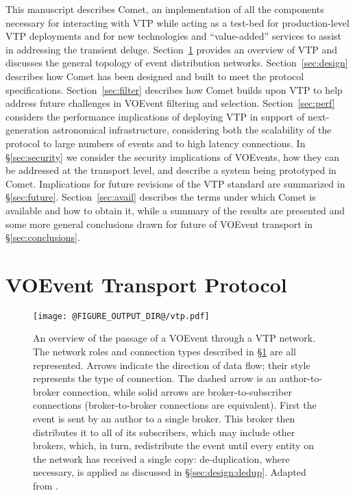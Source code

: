 \documentclass[5p,authoryear]{elsarticle}
\begin{document}
This manuscript describes Comet, an implementation of all the components
necessary for interacting with VTP while acting as a test-bed for
production-level VTP deployments and for new technologies and ``value-added''
services to assist in addressing the transient deluge. Section~\ref{sec:vtp}
provides an overview of VTP and discusses the general topology of event
distribution networks. Section~\ref{sec:design} describes how Comet has been
designed and built to meet the protocol specifications.
Section~\ref{sec:filter} describes how Comet builds upon VTP to help address
future challenges in VOEvent filtering and selection. Section~\ref{sec:perf}
considers the performance implications of deploying VTP in support of
next-generation astronomical infrastructure, considering both the scalability
of the protocol to large numbers of events and to high latency connections. In
\S\ref{sec:security} we consider the security implications of VOEvents, how
they can be addressed at the transport level, and describe a system being
prototyped in Comet.  Implications for future revisions of the VTP standard
are summarized in \S\ref{sec:future}. Section~\ref{sec:avail} describes the
terms under which Comet is available and how to obtain it, while a summary of
the results are presented and some more general conclusions drawn for future
of VOEvent transport in \S\ref{sec:conclusions}.

\section{VOEvent Transport Protocol}
\label{sec:vtp}

\begin{figure}
  \begin{center}
  \texttt{[image: @FIGURE\_OUTPUT\_DIR@/vtp.pdf]}
  \end{center}

  \caption{An overview of the passage of a VOEvent through a VTP network. The
  network roles and connection types described in \S\ref{sec:vtp} are all
  represented. Arrows indicate the direction of data flow; their style
  represents the type of connection. The dashed arrow is an author-to-broker
  connection, while solid arrows are broker-to-subscriber connections
  (broker-to-broker connections are equivalent). First the event is sent by an
  author to a single broker. This broker then distributes it to all of its
  subscribers, which may include other brokers, which, in turn, redistribute
  the event until every entity on the network has received a single copy:
  de-duplication, where necessary, is applied as discussed in
  \S\ref{sec:design:dedup}. Adapted from \citet{Swinbank:2014}.}

  \label{fig:vtp}
\end{figure}
\end{document}
